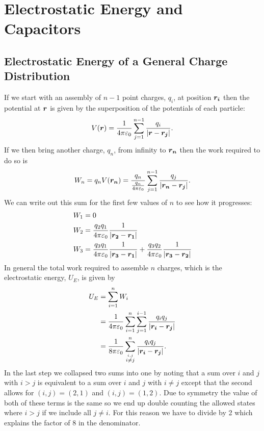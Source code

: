     \section{Electrostatic Energy and Capacitors}
    \subsection{Electrostatic Energy of a General Charge Distribution}\label{sec:energy electric field}
    If we start with an assembly of \(n - 1\) point charges, \(q_i\), at position \(\bm{r_i}\) then the potential at \(\bm{r}\) is given by the superposition of the potentials of each particle:
    \[V(\bm{r}) = \frac{1}{4\pi\varepsilon_0}\sum_{j=1}^{n-1}\frac{q_i}{\abs{\bm{r} - \bm{r_j}}}.\]
    If we then bring another charge, \(q_n\), from infinity to \(\bm{r_n}\) then the work required to do so is
    \[W_n = q_nV(\bm{r_n}) = \frac{q_n}{\frac{q_n}{4\pi\varepsilon_0}} \sum_{j=1}^{n-1}\frac{q_j}{\abs{\bm{r_n} - \bm{r_j}}}.\]
    We can write out this sum for the first few values of \(n\) to see how it progresses:
    \begin{align*}
        W_1 &= 0\\
        W_2 &= \frac{q_2q_1}{4\pi\varepsilon_0}\frac{1}{\abs{\bm{r_2} - \bm{r_1}}}\\
        W_3 &= \frac{q_3q_1}{4\pi\varepsilon_0}\frac{1}{\abs{\bm{r_3} - \bm{r_1}}} + \frac{q_3q_2}{4\pi\varepsilon_0}\frac{1}{\abs{\bm{r_3} - \bm{r_2}}}
    \end{align*}
    In general the total work required to assemble \(n\) charges, which is the electrostatic energy, \(U_E\), is given by
    \begin{align*}
        U_E &= \sum_{i=1}^{n}W_i\\
        &= \frac{1}{4\pi\varepsilon_0}\sum_{i=1}^{n}\sum_{j=1}^{i - 1}\frac{q_iq_j}{\abs{\bm{r_i} - \bm{r_j}}}\\
        &= \frac{1}{8\pi\varepsilon_0}\sum_{\stackrel{i, j}{i\ne j}}^{n}\frac{q_iq_j}{\abs{\bm{r_i} - \bm{r_j}}}.
    \end{align*}
    In the last step we collapsed two sums into one by noting that a sum over \(i\) and \(j\) with \(i > j\) is equivalent to a sum over \(i\) and \(j\) with \(i \ne j\) except that the second allows for \((i,j) = (2,1)\) and \((i,j)=(1,2)\).
    Due to symmetry the value of both of these terms is the same so we end up double counting the allowed states where \(i > j\) if we include all \(j \ne i\).
    For this reason we have to divide by 2 which explains the factor of \(8\) in the denominator.
    
